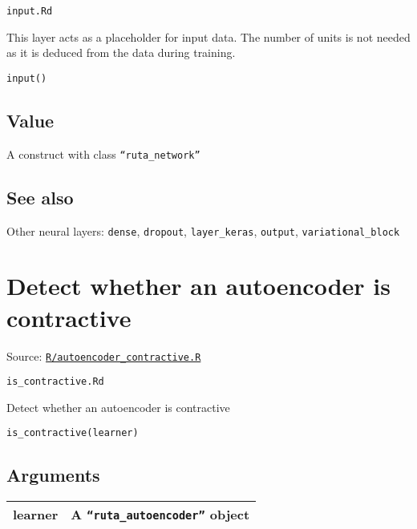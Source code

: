 \texttt{input.Rd}

This layer acts as a placeholder for input data. The number of units is
not needed as it is deduced from the data during training.

\begin{verbatim}
input()
\end{verbatim}

\hypertarget{value}{\subsection{\texorpdfstring{\protect\hyperlink{value}{}Value}{Value}}\label{value}}

A construct with class \texttt{``ruta\_network''}

\hypertarget{see-also}{\subsection{\texorpdfstring{\protect\hyperlink{see-also}{}See
also}{See also}}\label{see-also}}

Other neural layers: \texttt{dense}, \texttt{dropout},
\texttt{layer\_keras}, \texttt{output}, \texttt{variational\_block}

\section{Detect whether an autoencoder is
contractive}\label{detect-whether-an-autoencoder-is-contractive}

Source:
\href{https://github.com/fdavidcl/ruta/blob/master/R/autoencoder_contractive.R}{\texttt{R/autoencoder\_contractive.R}}

\texttt{is\_contractive.Rd}

Detect whether an autoencoder is contractive

\begin{verbatim}
is_contractive(learner)
\end{verbatim}

\hypertarget{arguments}{\subsection{\texorpdfstring{\protect\hyperlink{arguments}{}Arguments}{Arguments}}\label{arguments}}

\begin{longtable}[c]{@{}>{\small}p{3cm}>{\raggedright}p{12.5cm}@{}}
\toprule
learner & A \texttt{``ruta\_autoencoder''} object\tabularnewline
\bottomrule
\end{longtable}


